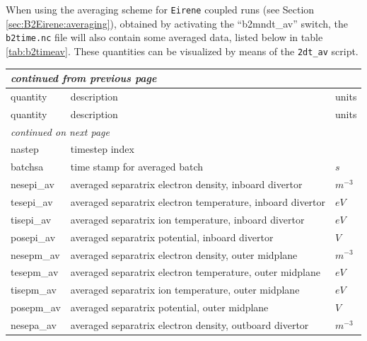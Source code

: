\documentclass[a4paper,10pt]{report}
\begin{document}
When using the averaging scheme for {\tt Eirene} coupled runs
(see Section \ref{sec:B2Eirene:averaging}), obtained by
activating the ``b2mndt\_av'' switch, the {\tt b2time.nc} file will also
contain some averaged data, listed below in table \ref{tab:b2timeav}.
These quantities can be visualized by means of the {\tt 2dt\_av} script.

\begin{center}
    \begin{longtable}{|l|l|l|}
    \hline
    \multicolumn{3}{|l|}{\small\sl continued from previous page} \\
    \hline quantity & description & units \\
    \hline \endhead
    \hline quantity & description & units \\
    \hline \endfirsthead
    \hline
    \multicolumn{3}{|l|}{\small\sl continued on next page} \\
    \hline \endfoot
    \endlastfoot
nastep \index{nastep}\index{b2time.nc, nastep} & timestep index & $  $ \\
batchsa \index{batchsa}\index{b2time.nc, batchsa} & time stamp for averaged batch & $s $ \\
nesepi\_av \index{nesepi\_av}\index{b2time.nc, nesepi\_av} & averaged separatrix electron density, inboard divertor & $m^{-3}$ \\
tesepi\_av \index{tesepi\_av}\index{b2time.nc, tesepi\_av} & averaged separatrix electron temperature, inboard divertor & $eV$ \\
tisepi\_av \index{tisepi\_av}\index{b2time.nc, tisepi\_av} & averaged separatrix ion temperature, inboard divertor & $eV$ \\
posepi\_av \index{posepi\_av}\index{b2time.nc, posepi\_av} & averaged separatrix potential, inboard divertor & $V $ \\
nesepm\_av \index{nesepm\_av}\index{b2time.nc, nesepm\_av} & averaged separatrix electron density, outer midplane & $m^{-3}$ \\
tesepm\_av \index{tesepm\_av}\index{b2time.nc, tesepm\_av} & averaged separatrix electron temperature, outer midplane & $eV$ \\
tisepm\_av \index{tisepm\_av}\index{b2time.nc, tisepm\_av} & averaged separatrix ion temperature, outer midplane & $eV$ \\
posepm\_av \index{posepm\_av}\index{b2time.nc, posepm\_av} & averaged separatrix potential, outer midplane & $V $ \\
nesepa\_av \index{nesepa\_av}\index{b2time.nc, nesepa\_av} & averaged separatrix electron density, outboard divertor & $m^{-3}$ \\

\end{longtable}
\end{center}
\end{document}
